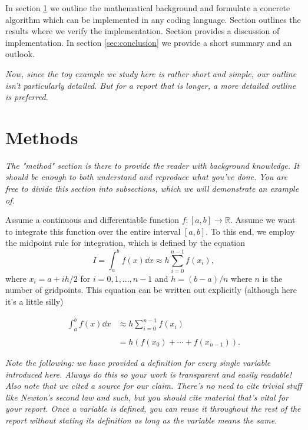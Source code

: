 \documentclass[english,notitlepage, reprint]{revtex4-1}  %
\begin{document}
In section \ref{sec:methods} we outline the mathematical background and formulate a concrete algorithm which can be implemented in any coding language. Section \label{sec:results} outlines the results where we verify the implementation. Section \label{sec:discussion} provides a discussion of implementation. In section \ref{sec:conclusion} we provide a short summary and an outlook.

\textit{Now, since the toy example we study here is rather short and simple, our outline isn't particularly detailed. But for a report that is longer, a more detailed outline is preferred.}

\section{Methods}\label{sec:methods}
\textit{The "method" section is there to provide the reader with background knowledge. It should be enough to both understand and reproduce what you've done. You are free to divide this section into subsections, which we will demonstrate an example of.}

Assume a continuous and differentiable function $f : [a,b] \to \mathbb{R}$. Assume we want to integrate this function over the entire interval $[a,b]$. To this end, we employ the midpoint rule for integration, which is defined by the equation \cite{midpoint_rule}
\begin{equation}
	I = \int_a^b f(x)\dd x \approx h\sum_{i=0}^{n-1} f(x_i),
\end{equation}
where $x_i = a + ih/2$ for $i = 0, 1, ..., n-1$ and $h = (b-a)/n$ where $n$ is the number of gridpoints. This equation can be written out explicitly (although here it's a little silly)

\begin{equation}
	\begin{split}
		\int_a^b f(x)\dd x & \approx h \sum_{i=0}^{n-1} f(x_i) \\
									\\
									& = h\left(f(x_0) + \cdots + f(x_{n-1})\right).
	\end{split}
\end{equation}

\textit{Note the following: we have provided a definition for every single variable introduced here. Always do this so your work is transparent and easily readable! Also note that we cited a source for our claim. There's no need to cite trivial stuff like Newton's second law and such, but you should cite material that's vital for your report. Once a variable is defined, you can reuse it throughout the rest of the report without stating its definition as long as the variable means the same.}
\end{document}
